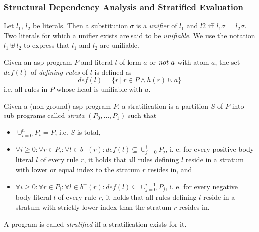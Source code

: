 \subsubsection{Structural Dependency Analysis and Stratified Evaluation}


\begin{definition}[Unification]
\label{def:prelims-asp-semantics-unification}
Let $l_1$, $l_2$ be literals. Then a substitution $\sigma$ is a \emph{unifier} of $l_1$ and $l2$ iff $l_{1}\sigma$ = $l_{2}\sigma$. Two literals for which a unifier exists are said to be \emph{unifiable}. We use the notation $l_1 \uplus l_2$ to express that $l_1$ and $l_2$ are unifiable.
\end{definition}

\begin{definition}
\label{def:prelims-asp-semantics}
Given an \gls{asp} program $P$ and literal $l$ of form $a$ or $\mathit{not}\ a$ with atom $a$, the set $\mathit{def}(l)$ of \emph{defining rules} of $l$ is defined as
\[
	\mathit{def}(l) = \{ r\ |\ r \in P \land h(r) \uplus a \}
\]
i.e. all rules in $P$ whose head is unifiable with $a$.
\end{definition}

\begin{definition}
\label{def:prelims-asp-semantics-stratification}
Given a (non-ground) \gls{asp} program $P$, a stratification is a partition $S$ of $P$ into sub-programs called \emph{strata} $(P_0,\ldots,P_1)$ such that
\begin{itemize}
	\item $\cup^{n}_{i = 0} P_i = P$, i.e. $S$ is total,
	\item $\forall i \geq 0: \forall r \in P_i: \forall l \in b^{+}(r): \mathit{def}(l) \subseteq \cup^{i}_{j = 0} P_j$, i. e. for every positive body literal $l$ of every rule $r$, it holds that all rules defining $l$ reside in a stratum with lower or equal index to the stratum $r$ resides in, and
	\item $\forall i \geq 0: \forall r \in P_i: \forall l \in b^{-}(r): \mathit{def}(l) \subseteq \cup^{i - 1}_{j = 0} P_j$, i. e. for every negative body literal $l$ of every rule $r$, it holds that all rules defining $l$ reside in a stratum with strictly lower index than the stratum $r$ resides in.
\end{itemize}
A program is called \emph{stratified} iff a stratification exists for it.
\end{definition}

